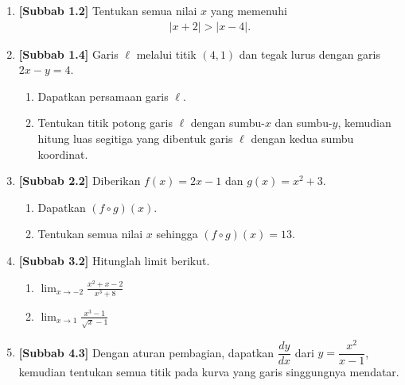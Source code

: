 \documentclass[10pt,openany,a4paper]{article}
\theoremstyle{definition}
\theoremstyle{definition}
\theoremstyle{plain}
\begin{document}
\newpage

\begin{enumerate}
    \item \textbf{[Subbab 1.2]} Tentukan semua nilai $x$ yang memenuhi
    \begin{align*}
        |x+2|>|x-4|.
    \end{align*}

    \item \textbf{[Subbab 1.4]} Garis $\ell$ melalui titik $(4,1)$ dan tegak lurus dengan garis $2x-y=4$.
    \begin{enumerate}
        \item Dapatkan persamaan garis $\ell$.
        \item Tentukan titik potong garis $\ell$ dengan sumbu-$x$ dan sumbu-$y$, kemudian hitung luas segitiga yang dibentuk garis $\ell$ dengan kedua sumbu koordinat.
    \end{enumerate}

    \item \textbf{[Subbab 2.2]} Diberikan $f(x)=2x-1$ dan $g(x)=x^2+3$.
    \begin{enumerate}
        \item Dapatkan $(f\circ g)(x)$.
        \item Tentukan semua nilai $x$ sehingga $(f\circ g)(x)=13$.
    \end{enumerate}

    \item \textbf{[Subbab 3.2]} Hitunglah limit berikut.
    \begin{enumerate}
        \item $\displaystyle\lim_{x\to -2}\frac{x^2+x-2}{x^3+8}$
        \item $\displaystyle\lim_{x\to 1}\frac{x^3-1}{\sqrt{x}-1}$
    \end{enumerate}

    \item \textbf{[Subbab 4.3]} Dengan aturan pembagian, dapatkan $\dfrac{dy}{dx}$ dari $y=\dfrac{x^2}{x-1}$, kemudian tentukan semua titik pada kurva yang garis singgungnya mendatar.
\end{enumerate}

\newpage
\end{document}

